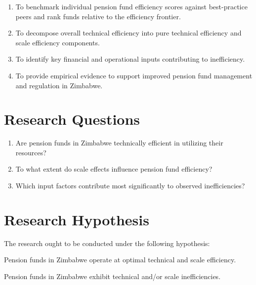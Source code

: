 \documentclass[12pt,a4paper]{article}
\begin{document}
\begin{enumerate}[noitemsep]
    \item To benchmark individual pension fund efficiency scores against best-practice peers and rank funds relative to the efficiency frontier.
    \item To decompose overall technical efficiency into pure technical efficiency and scale efficiency components.
    \item To identify key financial and operational inputs contributing to inefficiency.
    \item To provide empirical evidence to support improved pension fund management and regulation in Zimbabwe.
\end{enumerate}

\section{Research Questions}

\begin{enumerate}[noitemsep]
    \item Are pension funds in Zimbabwe technically efficient in utilizing their resources?
    \item To what extent do scale effects influence pension fund efficiency?
    \item Which input factors contribute most significantly to observed inefficiencies?
\end{enumerate}

\section{Research Hypothesis}

The research ought to be conducted under the following hypothesis:

\begin{description}[noitemsep]
    \item[$H_0$:] Pension funds in Zimbabwe operate at optimal technical and scale efficiency.
    \item[$H_1$:] Pension funds in Zimbabwe exhibit technical and/or scale inefficiencies.
\end{description}

\end{document}
